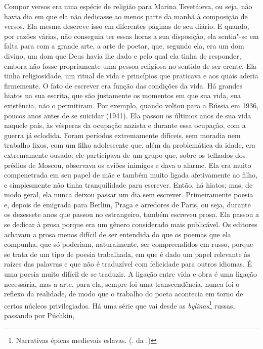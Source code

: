 Compor versos era uma espécie de religião para Marina
Tsvetáieva, ou seja, não havia dia em que ela não dedicasse ao menos parte
da manhã à composição de versos. Ela mesma descreve isso em diferentes
páginas de seu diário. E quando, por razões várias, não conseguia ter
essas horas a sua disposição, ela sentia"-se em falta para com a grande
arte, a arte de poetar, que, segundo ela, era um dom divino, um dom que
Deus havia lhe dado e pelo qual ela tinha de responder, embora não fosse
propriamente uma pessoa religiosa no sentido de ser crente. Ela tinha
religiosidade, um ritual de vida e princípios que praticava e aos quais
aderia firmemente. O fato de escrever era função das condições da vida.
Há grandes hiatos na sua escrita, que são justamente os momentos em que
sua vida, sua existência, não o permitiram. Por exemplo, quando voltou
para a Rússia em 1936, poucos anos antes de se suicidar (1941). Ela
passou os últimos anos de sua vida naquele país, às vésperas da ocupação
nazista e durante essa ocupação, com a guerra já eclodida. Foram
períodos extremamente difíceis, sem moradia nem trabalho fixos, com um
filho adolescente que, além da problemática da idade, era extremamente
ousado: ele participava de um grupo que, sobre os telhados dos prédios
de Moscou, observava os aviões inimigos e dava o alarme. Ela era muito
compenetrada em seu papel de mãe e também muito ligada afetivamente ao
filho, e simplesmente não tinha tranquilidade para escrever. Então, há
hiatos; mas, de modo geral, ela nunca deixou passar um dia sem escrever.
Primeiramente poesia e, depois de emigrada para Berlim, Praga e
arredores de Paris, ou seja, durante os dezessete anos que passou no
estrangeiro, também escreveu prosa. Ela passou a se dedicar à prosa
porque era um gênero considerado mais publicável. Os editores achavam a
prosa menos difícil de ser entendida do que os poemas que ela compunha,
que só poderiam, naturalmente, ser compreendidos em russo, porque se
trata de um tipo de poesia trabalhada, em que é dado um papel relevante
às raízes das palavras e que não é traduzível com felicidade para outros
idiomas. É uma poesia muito difícil de se traduzir. A ligação entre vida
e obra é uma ligação necessária, mas a arte, para ela, sempre foi uma
transcendência, nunca foi o reflexo da realidade, de modo que o trabalho
do poeta acontecia em torno de certos núcleos privilegiados. Há uma
série que vai desde as \emph{bylinas}\footnote{Narrativas épicas
  medievais eslavas. (. da .)} russas, passando por Púchkin,
